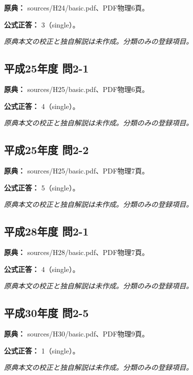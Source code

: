 \noindent\textbf{原典：} sources/H24/basic.pdf、PDF物理6頁。

\textbf{公式正答：} 3（single）。

\par\textit{原典本文の校正と独自解説は未作成。分類のみの登録項目。}

\subsection{平成25年度 問2-1}
\label{q:h25-reg-basic-2-1}

\noindent\textbf{原典：} sources/H25/basic.pdf、PDF物理6頁。

\textbf{公式正答：} 4（single）。

\par\textit{原典本文の校正と独自解説は未作成。分類のみの登録項目。}

\subsection{平成25年度 問2-2}
\label{q:h25-reg-basic-2-2}

\noindent\textbf{原典：} sources/H25/basic.pdf、PDF物理7頁。

\textbf{公式正答：} 5（single）。

\par\textit{原典本文の校正と独自解説は未作成。分類のみの登録項目。}

\subsection{平成28年度 問2-1}
\label{q:h28-reg-basic-2-1}

\noindent\textbf{原典：} sources/H28/basic.pdf、PDF物理7頁。

\textbf{公式正答：} 4（single）。

\par\textit{原典本文の校正と独自解説は未作成。分類のみの登録項目。}

\subsection{平成30年度 問2-5}
\label{q:h30-reg-basic-2-5}

\noindent\textbf{原典：} sources/H30/basic.pdf、PDF物理9頁。

\textbf{公式正答：} 1（single）。

\par\textit{原典本文の校正と独自解説は未作成。分類のみの登録項目。}

